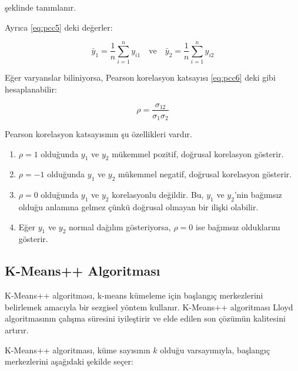 şeklinde tanımlanır.

Ayrıca \eqref{eq:pcc5} deki değerler:


\begin{equation}
    \bar{y}_{1} = \frac{1}{n} \sum_{i=1}^{n} y_{i1} \quad \text{ve} \quad \bar{y}_{2} = \frac{1}{n} \sum_{i=1}^{n} y_{i2}
    \label{eq:pcc5}
\end{equation}


Eğer varyanslar biliniyorsa, Pearson korelasyon katsayısı \eqref{eq:pcc6} deki gibi hesaplanabilir:

\begin{equation}
    \rho = \frac{\sigma_{12}}{\sigma_{1} \sigma_{2}}
    \label{eq:pcc6}
\end{equation}


Pearson korelasyon katsayısının şu özellikleri vardır.

\begin{enumerate}
    \item \(\rho = 1\) olduğunda \(y_{1}\) ve \(y_{2}\) mükemmel pozitif, doğrusal korelasyon gösterir.
    \item \(\rho = -1\) olduğunda \(y_{1}\) ve \(y_{2}\) mükemmel negatif, doğrusal korelasyon gösterir.
    \item \(\rho = 0\) olduğunda \(y_{1}\) ve \(y_{2}\) korelasyonlu değildir. Bu, \(y_{1}\) ve \(y_{2}\)’nin bağımsız olduğu anlamına gelmez çünkü doğrusal olmayan bir ilişki olabilir.
    \item Eğer \(y_{1}\) ve \(y_{2}\) normal dağılım gösteriyorsa, \(\rho = 0\) ise bağımsız olduklarını gösterir.
\end{enumerate}

\begin{comment}
    (Choudhary ve Nagaraja, 2017):
    ((kaynak: https://www.sciencedirect.com/topics/engineering/pearsons-linear-correlation-coefficient ))
\end{comment}


\subsection{K-Means++ Algoritması}

K-Means++ algoritması, k-means kümeleme için başlangıç merkezlerini belirlemek amacıyla bir sezgisel yöntem kullanır. K-Means++ algoritması Lloyd algoritmasının çalışma süresini iyileştirir ve elde edilen son çözümün kalitesini artırır.

\medskip

K-Means++ algoritması, küme sayısının \(k\) olduğu varsayımıyla, başlangıç merkezlerini aşağıdaki şekilde seçer:

